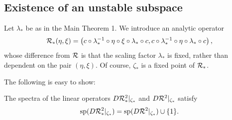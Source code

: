






\subsection{Existence of an unstable subspace}
Let $\lambda_*$ be as in the Main Theorem 1. 
We introduce an analytic operator
\begin{equation}
\mathcal{R}_*(\eta,\xi)=\left(c \circ \lambda_*^{-1} \circ \eta \circ \xi \circ \lambda_* \circ c, c \circ \lambda_*^{-1} \circ \eta  \circ \lambda_*   \circ c \right),
\end{equation}
whose difference from $\mathcal{R}$ is that the scaling factor $\lambda_*$ is fixed, rather than dependent on the pair $(\eta,\xi)$.
Of course, $\zeta_*$ is a fixed point of $\mathcal{R}_*$. 

The following is easy to show:
\begin{lemma}
\label{difference-spectrum}
The spectra of the linear operators $D\mathcal{R}_*^2|_{\zeta_*}$ and $D\mathcal{R}^2|_{\zeta_*}$ satisfy
$$\text{sp}(D\mathcal{R}_*^2|_{\zeta_*})=\text{sp}(D\mathcal{R}^2|_{\zeta_*})\cup\{ 1\}.$$
\end{lemma}

